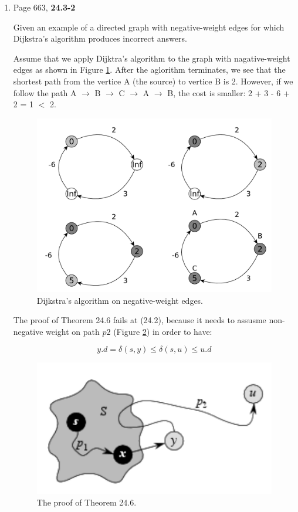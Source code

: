 \documentclass[11pts]{report}
\begin{document}
\begin{enumerate}
\item Page 663, \textbf{24.3-2}

Given an example of a directed graph with negative-weight edges for which Dijkstra's algorithm produces incorrect answers.

Assume that we apply Dijktra's algorithm to the graph with nagative-weight edges as shown in Figure \ref{Fig:4}. After the aglorithm terminates, we see that the shortest path from the vertice A (the source) to vertice B is 2. However, if we follow the path A $\to$ B $\to$ C $\to$ A $\to$ B, the cost is smaller: 2 + 3 - 6 + 2 = 1 $<$ 2.

\begin{figure}[htbp]
\begin{center}
\includegraphics[scale=0.5]{4.pdf}
\caption{Dijkstra's algorithm on negative-weight edges.}
\label{Fig:4}
\end{center}
\end{figure}

The proof of Theorem 24.6 fails at (24.2), because it needs to assusme non-negative weight on path $p2$ (Figure \ref{Fig:5}) in order to have:

\begin{equation*}
y.d = \delta(s,y) \leq \delta(s,u) \leq u.d
\end{equation*}

\begin{figure}[htbp]
\begin{center}
\includegraphics[scale=0.5]{4.png}
\caption{The proof of Theorem 24.6.}
\label{Fig:5}
\end{center}
\end{figure}


\end{enumerate}
\end{document}
